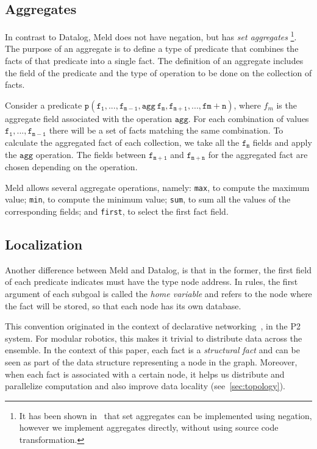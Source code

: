 \documentclass[preprint]{sigplanconf}
\begin{document}
\subsection{Aggregates}

In contrast to Datalog, Meld does not have negation, but has \emph{set aggregates}
\footnote{It has been shown in~\cite{zaniolo-arni-ong-dood93} that set aggregates can be
implemented using negation, however we implement aggregates directly, without using source
code transformation.}. The purpose of an aggregate is to define a type of predicate that combines
the facts of that predicate into a single fact. The definition of an aggregate includes the
field of the predicate and the type of operation to be done on the collection of facts.

Consider a predicate $\mathtt{p(f_1, ..., f_{m-1}, agg\ f_{m}, f_{m+1}, ..., f{m+n})}$,
where $f_m$ is the aggregate field associated with the operation $\mathtt{agg}$. For each
combination of values $\mathtt{f_1, ..., f_{m-1}}$ there will be a set of facts matching
the same combination. To calculate the aggregated fact of each collection, we take all
the $\mathtt{f_{m}}$ fields and apply the $\mathtt{agg}$ operation. The fields between
$\mathtt{f_{m+1}}$ and $\mathtt{f_{m+n}}$ for the aggregated fact are chosen depending
on the operation.

Meld allows several aggregate operations, namely: \texttt{max}, to compute the maximum value;
\texttt{min}, to compute the minimum value; \texttt{sum}, to sum all the values of the corresponding
fields; and \texttt{first}, to select the first fact field.

\subsection{Localization}\label{sec:localization}

Another difference between Meld and Datalog, is that in the former, the first field
of each predicate indicates must have the type node address.
In rules, the first argument of each subgoal is called the \emph{home variable} and
refers to the node where the fact will be stored, so that each node has its own database.

This convention originated in the context of declarative networking~\cite{Loo-condie-garofalakis-p2},
in the P2 system. For modular robotics, this makes it trivial to
distribute data across the ensemble. In the context of this paper, each fact is a
\emph{structural fact} and can be seen as part of the data structure representing a node in the graph.
Moreover, when each fact is associated with a certain node, it helps us distribute
and parallelize computation and also improve data locality (see~\ref{sec:topology}).
\end{document}
